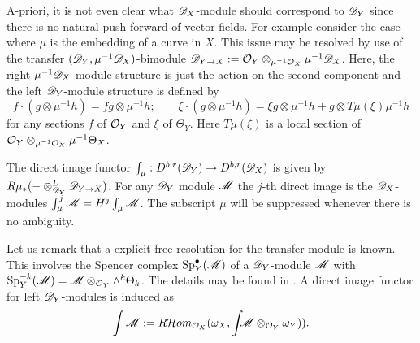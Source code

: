 A-priori, it is not even clear what $\mathscr{D}_X$-module should correspond to $\mathscr{D}_Y$ since there is no natural push forward of vector fields.
For example consider the case where $\mu$ is the embedding of a curve in $X$.
This issue may be resolved by use of the transfer $(\mathscr{D}_Y,\mu^{-1}\mathscr{D}_X)$-bimodule $\mathscr{D}_{Y\to X}:= \mathcal{O}_Y \otimes_{\mu^{-1}\mathcal{O}_X}\mu^{-1}\mathscr{D}_X$.
Here, the right $\mu^{-1}\mathscr{D}_X$-module structure is just the action on the second component and the left $\mathscr{D}_Y$-module structure is defined by
$$f\cdot (g\otimes \mu^{-1}h) = fg \otimes \mu^{-1}h; \qquad \xi\cdot (g\otimes\mu^{-1}h) = \xi g \otimes \mu^{-1}h + g \otimes T\mu(\xi)\mu^{-1}h $$
for any sections $f$ of $\mathcal{O}_Y$ and $\xi$ of $\Theta_Y$.
Here $T\mu(\xi)$ is a local section of $\mathcal{O}_Y\otimes_{\mu^{-1}\mathcal{O}_X} \mu^{-1}\Theta_X$.
\begin{definition}
  The direct image functor $\int_\mu:D^{b,r}(\mathscr{D}_Y)\to D^{b,r}(\mathscr{D}_X)$ is given by $R\mu_* ({-}\otimes_{\mathscr{D}_Y}^L \mathscr{D}_{Y\to X})$.
  For any $\mathscr{D}_Y$ module $\mathscr{M}$ the $j$-th direct image is the $\mathscr{D}_X$-modules $\int_\mu^j \mathscr{M} = H^j \int_\mu \mathscr{M}$.
  The subscript $\mu$ will be suppressed whenever there is no ambiguity.
\end{definition}
Let us remark that a explicit free resolution for the transfer module is known.
This involves the Spencer complex $\operatorname{Sp}_Y^\bullet(\mathscr{M})$ of a $\mathscr{D}_Y$-module $\mathscr{M}$ with $\operatorname{Sp}_Y^{-k}(\mathscr{M}) = \mathscr{M}\otimes_{\mathcal{O}_Y}\wedge^k \Theta_k$.
The details may be found in \cite{sabbah2011introduction}.
A direct image functor for left $\mathscr{D}_Y$-modules is induced as  $$\int\mathscr{M} := R\mathcal{H}om_{\mathcal{O}_X}(\omega_X,\int\mkern -8mu  \mathscr{M}\otimes_{\mathcal{O}_Y} \omega_Y)).$$

